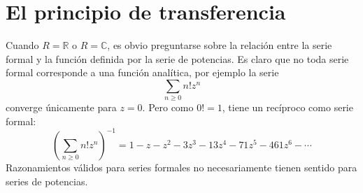 \section{El principio de transferencia}
\label{sec:series-principio-transferencia}

  Cuando \(R = \mathbb{R}\) o \(R = \mathbb{C}\),
  es obvio preguntarse sobre la relación entre la serie formal
  y la función definida por la serie de potencias.
  Es claro que no toda serie formal corresponde a una función analítica,
  por ejemplo la serie
  \begin{equation*}
    \sum_{n \ge 0} n! z^n
  \end{equation*}
  converge únicamente para \(z = 0\).
  Pero como \(0! = 1\),
  tiene un recíproco como serie formal:
  \begin{equation*}
    \left( \sum_{n \ge 0} n! z^n \right)^{-1}
      = 1 - z - z^2 - 3 z^3 - 13 z^4 - 71 z^5 - 461 z^6 - \dotsb
  \end{equation*}
  Razonamientos válidos para series formales
  no necesariamente tienen sentido para series de potencias.

